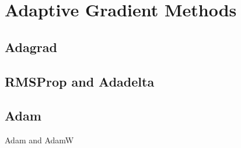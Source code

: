 \section{Adaptive Gradient Methods}

\subsection{Adagrad}

\subsection{RMSProp and Adadelta}

\subsection{Adam} 

  Adam and AdamW

